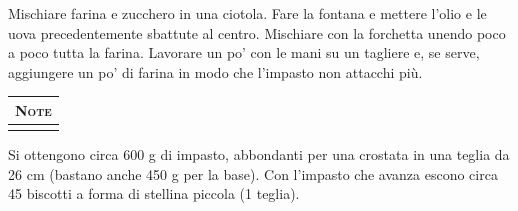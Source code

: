 \documentclass[../../main.tex]{subfiles}
\begin{document}
\begin{minipage}[t][\textheight][t]{\textwidth}
\begin{minipage}[t]{0.65\textwidth}
        Mischiare farina e zucchero in una ciotola. Fare la fontana e mettere l'olio e le uova precedentemente sbattute al centro. Mischiare con la forchetta unendo poco a poco tutta la farina. Lavorare un po' con le mani su un tagliere e, se serve, aggiungere un po' di farina in modo che l'impasto non attacchi più.
    \end{minipage}

    \vspace*{\fill}

    \begin{tabularx}{\linewidth}{X}
    {\Large \textsc{Note}} \\ \hline \hline \\
    \end{tabularx}
    Si ottengono circa 600 g di impasto, abbondanti per una crostata in una teglia da 26 cm (bastano anche 450 g per la base). Con l'impasto che avanza escono circa 45 biscotti a forma di stellina piccola (1 teglia).
\end{minipage}
\end{document}
